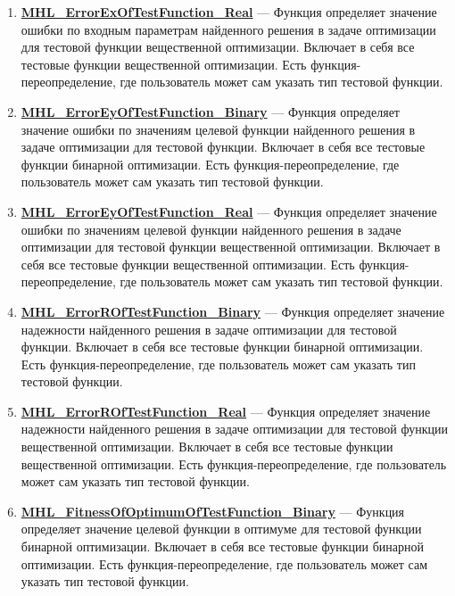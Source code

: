 \documentclass[a4paper,12pt]{article}
\begin{document}
\begin{enumerate}
\item \textbf{\hyperref[MHL_ErrorExOfTestFunction_Real]{MHL\_ErrorExOfTestFunction\_Real}} --- Функция определяет значение ошибки по входным параметрам найденного решения в задаче оптимизации для тестовой функции вещественной оптимизации. Включает в себя все тестовые функции вещественной оптимизации. Есть функция-переопределение, где пользователь может сам указать тип тестовой функции.

\item \textbf{\hyperref[MHL_ErrorEyOfTestFunction_Binary]{MHL\_ErrorEyOfTestFunction\_Binary}} --- Функция определяет значение ошибки по значениям целевой функции найденного решения в задаче оптимизации для тестовой функции. Включает в себя все тестовые функции бинарной оптимизации. Есть функция-переопределение, где пользователь может сам указать тип тестовой функции.

\item \textbf{\hyperref[MHL_ErrorEyOfTestFunction_Real]{MHL\_ErrorEyOfTestFunction\_Real}} --- Функция определяет значение ошибки по значениям целевой функции найденного решения в задаче оптимизации для тестовой функции вещественной оптимизации. Включает в себя все тестовые функции вещественной оптимизации. Есть функция-переопределение, где пользователь может сам указать тип тестовой функции.

\item \textbf{\hyperref[MHL_ErrorROfTestFunction_Binary]{MHL\_ErrorROfTestFunction\_Binary}} --- Функция определяет значение надежности найденного решения в задаче оптимизации для тестовой функции. Включает в себя все тестовые функции бинарной оптимизации. Есть функция-переопределение, где пользователь может сам указать тип тестовой функции.

\item \textbf{\hyperref[MHL_ErrorROfTestFunction_Real]{MHL\_ErrorROfTestFunction\_Real}} --- Функция определяет значение надежности найденного решения в задаче оптимизации для тестовой функции вещественной оптимизации. Включает в себя все тестовые функции  вещественной оптимизации. Есть функция-переопределение, где пользователь может сам указать тип тестовой функции.

\item \textbf{\hyperref[MHL_FitnessOfOptimumOfTestFunction_Binary]{MHL\_FitnessOfOptimumOfTestFunction\_Binary}} --- Функция определяет значение целевой функции в оптимуме для тестовой функции бинарной оптимизации. Включает в себя все тестовые функции бинарной оптимизации. Есть функция-переопределение, где пользователь может сам указать тип тестовой функции.


\end{enumerate}
\end{document}
